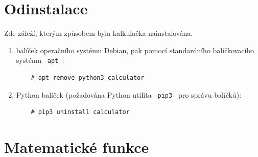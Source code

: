 \documentclass[a4paper, 11pt]{article}
\begin{document}
\section{Odinstalace}

Zde záleží, kterým způsobem byla kalkulačka nainstalována.
\begin{enumerate}
    \item balíček operačního systému Debian, pak pomocí standardního balíčkovacího systému \texttt{ apt }:
    \begin{lstlisting}
    # apt remove python3-calculator
    \end{lstlisting}
    \item Python balíček (požadována Python utilita \texttt{ pip3 } pro správu balíčků):
    \begin{lstlisting}
    # pip3 uninstall calculator
    \end{lstlisting}
\end{enumerate}

\section{Matematické funkce}
\end{document}
